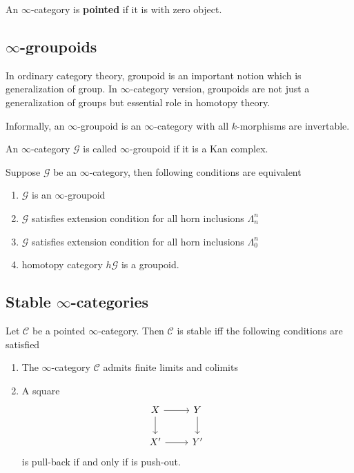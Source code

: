 \begin{mydefn}
  An $\infty$-category is \textbf{pointed} if it is with zero object.
\end{mydefn}

\subsection{$\infty$-groupoids}
In ordinary category theory, groupoid is an important notion which is generalization of group. In $\infty$-category version, groupoids are not just a generalization of groups but essential role in homotopy theory.
\par
Informally, an $\infty$-groupoid is an $\infty$-category with all $k$-morphisms are invertable.
\begin{mydefn}
  An $\infty$-category $\mathcal{G}$ is called $\infty$-groupoid if it is a Kan complex.
\end{mydefn}
\begin{prop}[Joyal]
  Suppose $\mathcal{G}$ be an $\infty$-category, then following conditions are equivalent
  \begin{enumerate}
    \item $\mathcal{G}$ is an $\infty$-groupoid
    \item $\mathcal{G}$ satisfies extension condition for all horn inclusions $\Lambda^{n}_n$
    \item $\mathcal{G}$ satisfies extension condition for all horn inclusions $\Lambda^{n}_0$
    \item homotopy category $h \mathcal{G}$ is a groupoid.
  \end{enumerate}
\end{prop}

\subsection{Stable $\infty$-categories}
\begin{prop}
  Let $\mathcal{C}$ be a pointed $\infty$-category. Then $\mathcal{C}$ is stable iff the following conditions are satisfied
\begin{enumerate}
  \item The $\infty$-category $\mathcal{C}$ admits finite limits and colimits
  \item A square
  \[
  \begin{tikzcd}
  X \ar[r] \ar[d]&Y \ar[d]&\\
  X' \ar[r] &Y'&
  \end{tikzcd}
  \]
  is pull-back if and only if is push-out.
\end{enumerate}
\end{prop}
